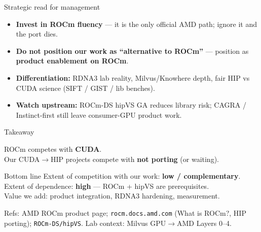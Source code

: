 \documentclass[aspectratio=169,11pt]{beamer}
\begin{document}
\begin{frame}{Strategic read for management}
  \begin{itemize}
    \item \textbf{Invest in ROCm fluency} --- it is the only official AMD path;
          ignore it and the port dies.
    \item \textbf{Do not position our work as ``alternative to ROCm''} ---
          position as \textbf{product enablement on ROCm}.
    \item \textbf{Differentiation:} RDNA3 lab reality, Milvus/Knowhere depth,
          fair HIP vs CUDA science (SIFT / GIST / lib benches).
    \item \textbf{Watch upstream:} ROCm-DS hipVS GA reduces library risk;
          CAGRA / Instinct-first still leave consumer-GPU product work.
  \end{itemize}
\end{frame}

\begin{frame}{Takeaway}
  \begin{center}
    \Large
    ROCm competes with \textbf{CUDA}.\\[0.35em]
    {\normalsize Our CUDA$\rightarrow$HIP projects compete with
     \textbf{not porting} (or waiting).}\\[0.6em]
  \end{center}

  \begin{block}{Bottom line}
    Extent of competition with our work: \textbf{low / complementary}.\\
    Extent of dependence: \textbf{high} --- ROCm + hipVS are prerequisites.\\
    Value we add: product integration, RDNA3 hardening, measurement.
  \end{block}

  \vspace{0.4em}
  {\footnotesize
  Refs: AMD ROCm product page; \texttt{rocm.docs.amd.com} (What is ROCm?, HIP porting);
  \texttt{ROCm-DS/hipVS}. Lab context: Milvus GPU$\rightarrow$AMD Layers 0--4.}
\end{frame}
\end{document}
